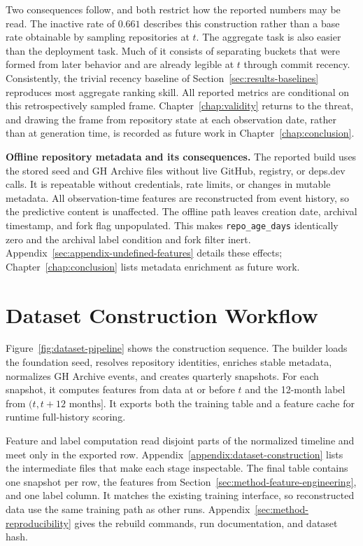 Two consequences follow, and both restrict how the reported numbers may be read.
The inactive rate of \(0.661\) describes this construction rather than a base
rate obtainable by sampling repositories at \(t\). The aggregate task is also
easier than the deployment task. Much of it consists of
separating buckets that were formed from later behavior and are already legible
at \(t\) through commit recency. Consistently, the trivial recency baseline of
Section~\ref{sec:results-baselines} reproduces most aggregate ranking skill. All
reported metrics are conditional on this retrospectively
sampled frame. Chapter~\ref{chap:validity} returns to the threat, and drawing the
frame from repository state at each observation date, rather than at generation
time, is recorded as future work in
Chapter~\ref{chap:conclusion}.

\label{sec:method-offline-metadata}
\textbf{Offline repository metadata and its consequences.} The reported build
uses the stored seed and GH Archive files without live GitHub, registry, or
deps.dev calls. It is repeatable without credentials, rate limits, or changes in
mutable metadata. All observation-time features are reconstructed from event
history, so the predictive content is unaffected. The offline path leaves
creation date, archival timestamp, and fork flag unpopulated. This makes
\texttt{repo\_age\_days} identically zero and the archival label condition and
fork filter inert. Appendix~\ref{sec:appendix-undefined-features}
details these effects; Chapter~\ref{chap:conclusion} lists metadata enrichment as
future work.

\section{Dataset Construction Workflow}
\label{sec:method-dataset-construction}

Figure~\ref{fig:dataset-pipeline} shows the construction sequence. The builder
loads the foundation seed, resolves repository identities, enriches stable
metadata, normalizes GH Archive events, and creates quarterly snapshots. For each
snapshot, it computes features from data at or before \(t\) and the 12-month
label from \((t, t + 12\text{ months}]\). It exports both the training table and
a feature cache for runtime full-history scoring.

Feature and label computation read disjoint parts of the normalized timeline and
meet only in the exported row. Appendix~\ref{appendix:dataset-construction} lists
the intermediate files that make each stage inspectable. The final table contains
one snapshot per row, the features from
Section~\ref{sec:method-feature-engineering}, and one label column. It matches the
existing training interface, so reconstructed data use the same training path as
other runs. Appendix~\ref{sec:method-reproducibility} gives the rebuild commands,
run documentation, and dataset hash.

